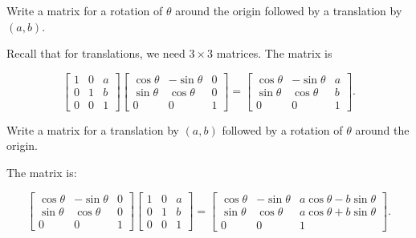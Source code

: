 \documentclass[../key.tex]{subfiles}
\begin{document}
\begin{outer_problem}
\item
\end{outer_problem}

\begin{inner_problem}[start=1]
\item Write a matrix for a rotation of $\theta$ around the origin followed by a translation by $(a,b)$.
\end{inner_problem}

Recall that for translations, we need $3\times 3$ matrices. The matrix is

$$\begin{bmatrix}1 & 0 & a \\ 0 & 1 & b \\ 0 & 0 & 1 \end{bmatrix} \begin{bmatrix} \cos\theta & -\sin\theta & 0 \\ \sin\theta & \cos\theta & 0 \\ 0 & 0 & 1 \end{bmatrix} = \begin{bmatrix} \cos\theta & -\sin\theta & a \\ \sin\theta & \cos\theta & b \\ 0 & 0 & 1 \end{bmatrix}.$$

\begin{inner_problem}
\item Write a matrix for a translation by $(a,b)$ followed by a rotation of $\theta$ around the origin.
\end{inner_problem}

The matrix is:

$$\begin{bmatrix} \cos\theta & -\sin\theta & 0 \\ \sin\theta & \cos\theta & 0 \\ 0 & 0 & 1 \end{bmatrix} \begin{bmatrix}1 & 0 & a \\ 0 & 1 & b \\ 0 & 0 & 1 \end{bmatrix} = \begin{bmatrix} \cos\theta & -\sin\theta & a\cos\theta - b\sin\theta \\ \sin\theta & \cos\theta & a\cos\theta + b\sin\theta \\ 0 & 0 & 1 \end{bmatrix}.$$
\end{document}
